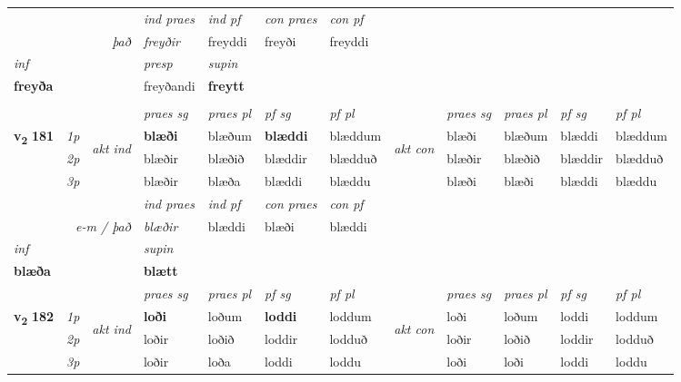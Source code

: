 \begin{longtable}[l]{X>{\footnotesize\itshape}llXXXXlXXXX}
   && &  \textit{ind praes} & \textit{ind pf} & \textit{con praes} & \textit{con pf} \\*
\multicolumn{3}{r}{\textit{það}} & freyðir & freyddi & freyði & freyddi \\*

\cmidrule{4-7}
   {\textit{inf}} & &     & \textit{presp} & \textit{supin}   \\*
  {\textbf{freyða}} & &     & freyðandi &  \textbf{freytt}   \\*
\midrule
& \\
\midrule
 & &   & \textit{praes sg}  & \textit{praes pl}    & \textit{ pf sg} & \textit{pf pl} & & \textit{praes sg}  & \textit{praes pl}    & \textit{pf sg} & \textit{pf pl }  \\ \cmidrule{4-7} \cmidrule{9-12}
 \multirow{2}{*}{{{\textbf{v{\textsubscript{2}}} \Large{\textbf{181}}}}}  & 1p & \multirow{3}{*}{\begin{turn}{90}\textit{akt ind}\end{turn}} & \textbf{blæði} & blæðum & \textbf{blæddi} & blæddum & \multirow{3}{*}{\begin{turn}{90}\textit{akt con}\end{turn}} &blæði & blæðum & blæddi & blæddum\\*
 & 2p &  &  blæðir  & blæðið & blæddir & blædduð & & blæðir & blæðið & blæddir & blædduð \\*
 & 3p &  & blæðir & blæða & blæddi & blæddu & & blæði & blæði& blæddi & blæddu \\*
\cmidrule{4-7} \cmidrule{9-12}

   && &  \textit{ind praes} & \textit{ind pf} & \textit{con praes} & \textit{con pf} \\*
\multicolumn{3}{r}{\textit{e-m / það}} & blæðir & blæddi & blæði & blæddi \\*

\cmidrule{4-7}
   {\textit{inf}} & &      & \textit{supin}   \\*
  {\textbf{blæða}} & &      &  \textbf{blætt}   \\*

\midrule

 & &   & \textit{praes sg}  & \textit{praes pl}    & \textit{ pf sg} & \textit{pf pl} & & \textit{praes sg}  & \textit{praes pl}    & \textit{pf sg} & \textit{pf pl }  \\ \cmidrule{4-7} \cmidrule{9-12}
 \multirow{2}{*}{{{\textbf{v{\textsubscript{2}}} \Large{\textbf{182}}}}}  & 1p & \multirow{3}{*}{\begin{turn}{90}\textit{akt ind}\end{turn}} & \textbf{loði} & loðum & \textbf{loddi} & loddum & \multirow{3}{*}{\begin{turn}{90}\textit{akt con}\end{turn}} &loði & loðum & loddi & loddum\\*
 & 2p &  &  loðir  & loðið & loddir & lodduð & & loðir & loðið & loddir & lodduð \\*
 & 3p &  & loðir & loða & loddi & loddu & & loði & loði& loddi & loddu \\*
\cmidrule{4-7} \cmidrule{9-12}


\end{longtable}
